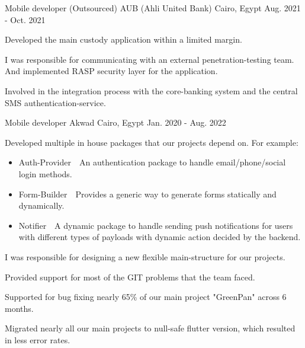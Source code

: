 \begin{cventries}
  \cventry
    {Mobile developer (Outsourced)} %
    {AUB (Ahli United Bank)} %
    {Cairo, Egypt} %
    {Aug. 2021 - Oct. 2021} %
    {
      \begin{cvitems} %
        \item {Developed the main custody application within a limited margin.}
        \item {I was responsible for communicating with an external penetration-testing team. And implemented RASP security layer for the application.}
        \item {Involved in the integration process with the core-banking system and the central SMS authentication-service.}
      \end{cvitems}
    }

  \cventry
    {Mobile developer} %
    {Akwad} %
    {Cairo, Egypt} %
    {Jan. 2020 - Aug. 2022} %
    {
      \begin{cvitems} %
        \item {Developed multiple in house packages that our projects depend on. For example:}
        \begin{itemize}
          \item {Auth-Provider~\rightarrow~An authentication package to handle email/phone/social login methods.}
          \item {Form-Builder~\rightarrow~Provides a generic way to generate forms statically and dynamically.}
          \item {Notifier~\rightarrow~A dynamic package to handle sending push notifications for users with different types of payloads with dynamic action decided by the backend.}
        \end{itemize}
        \item {I was responsible for designing a new flexible main-structure for our projects.}
        \item {Provided support for most of the GIT problems that the team faced.}
        \item {Supported for bug fixing nearly 65\% of our main project "GreenPan" across 6 months.}
        \item {Migrated nearly all our main projects to null-safe flutter version, which resulted in less error rates.}
      \end{cvitems}
    }


\end{cventries}
